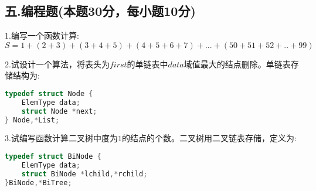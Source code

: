 \subsection{五.编程题(本题30分，每小题10分)}
1.编写一个函数计算: \\
$S=1+(2+3)+(3+4+5)+(4+5+6+7)+...+(50+51+52+..+99)$

2.试设计一个算法，将表头为$first$的单链表中$data$域值最大的结点删除。单链表存储结构为:
\begin{lstlisting}[language=cpp]
typedef struct Node {
    ElemType data;
    struct Node *next;
} Node,*List;
\end{lstlisting}

3.试编写函数计算二叉树中度为$1$的结点的个数。二叉树用二叉链表存储，定义为:
\begin{lstlisting}[language=cpp]
typedef struct BiNode {
    ElemType data;
    struct BiNode *lchild,*rchild;
}BiNode,*BiTree;
\end{lstlisting}